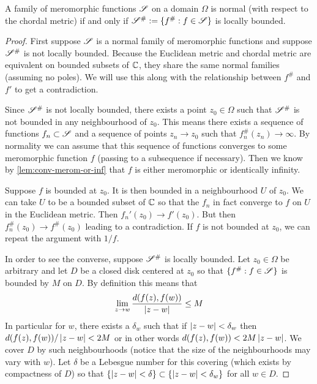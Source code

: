 \begin{theorem}\label{thm:marty}
    A family of meromorphic functions $\mathscr{S}$ on a domain $\Omega$ is normal (with respect to the chordal metric) if and only if $\mathscr{S}^\# := \{f^\# : f \in \mathscr{S}\}$ is locally bounded.
\end{theorem}
\begin{proof}
    First suppose $\mathscr{S}$ is a normal family of meromorphic functions and suppose $\mathscr{S}^\#$ is not locally bounded. Because the Euclidean metric and chordal metric are equivalent on bounded subsets of $\mathbb{C}$, they share the same normal families (assuming no poles). We will use this along with the relationship between $f^\#$ and $f'$ to get a contradiction.
    
    Since $\mathscr{S}^\#$ is not locally bounded, there exists a point $z_0 \in \Omega$ such that $\mathscr{S}^\#$ is not bounded in any neighbourhood of $z_0$. This means there exists a sequence of functions $f_n \subset \mathscr{S}$ and a sequence of points $z_n \to z_0$ such that $f_n^\#(z_n) \to \infty$. By normality we can assume that this sequence of functions converges to some meromorphic function $f$ (passing to a subsequence if necessary). Then we know by \autoref{lem:conv-merom-or-inf} that $f$ is either meromorphic or identically infinity. 
    
    Suppose $f$ is bounded at $z_0$. It is then bounded in a neighbourhood $U$ of $z_0$. We can take $U$ to be a bounded subset of $\mathbb{C}$ so that the $f_n$ in fact converge to $f$ on $U$ in the Euclidean metric. Then $f_n'(z_0) \to f'(z_0)$. But then $f_n^\#(z_0) \to f^\#(z_0)$ leading to a contradiction. If $f$ is not bounded at $z_0$, we can repeat the argument with $1/f$. 

    In order to see the converse, suppose $\mathscr{S}^\#$ is locally bounded. Let $z_0 \in \Omega$ be arbitrary and let $D$ be a closed disk centered at $z_0$ so that $\{f^\# : f \in \mathscr{S}\}$ is bounded by $M$ on $D$. By definition this means that 
    \begin{align*}
        \lim_{z \to w} \frac{d(f(z), f(w))}{\left|z - w\right|} \leq M
    \end{align*}
    In particular for $w$, there exists a $\delta_w$ such that if $\left|z - w\right| < \delta_w$ then $d(f(z), f(w))/\left|z - w\right| < 2M$ or in other words $d(f(z), f(w)) < 2M \left|z - w\right|$. We cover $D$ by such neighbourhoods (notice that the size of the neighbourhoods may vary with $w$). Let $\delta$ be a Lebesgue number for this covering (which exists by compactness of $D$) so that $\{\left|z - w\right| < \delta\} \subset \{\left|z - w\right| < \delta_w\}$ for all $w \in D$. 


\end{proof}
